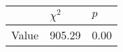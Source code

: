 \begin{tabular}{lll}
\toprule
 & $\chi^2$ & $p$ \\
\midrule
Value & 905.29 & 0.00 \\
\bottomrule
\end{tabular}
